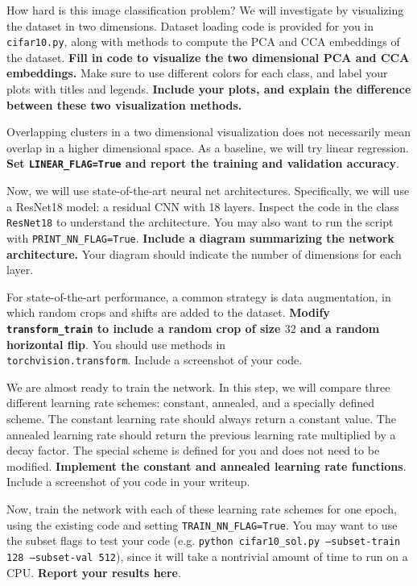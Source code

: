 \documentclass[preview]{standalone}
\begin{document}
\begin{Parts}
\Part 
How hard is this image classification problem? We will investigate by visualizing the dataset in two dimensions. 
Dataset loading code is provided for you in \texttt{cifar10.py}, along with methods to compute the PCA and CCA embeddings of the dataset. {\bf Fill in code to visualize the two dimensional PCA and CCA embeddings.} Make sure to use different colors for each class, and label your plots with titles and legends.
{\bf Include your plots, and explain the difference between these two visualization methods.} 




\Part 
Overlapping clusters in a two dimensional visualization does not necessarily mean overlap in a higher dimensional space. 
As a baseline, we will try linear regression. {\bf Set \texttt{LINEAR\_FLAG=True} and report the training and validation accuracy}.



\Part Now, we will use state-of-the-art neural net architectures. Specifically, we will use a ResNet18 model: a residual CNN with 18 layers. Inspect the code in the class \texttt{ResNet18} to understand the architecture. You may also want to run the script with \texttt{PRINT\_NN\_FLAG=True}. {\bf Include a diagram summarizing the network architecture.} Your diagram should indicate the number of dimensions for each layer. 




\Part For state-of-the-art performance, a common strategy is data augmentation, in which random crops and shifts are added to the dataset. 
{\bf Modify \texttt{transform\_train} to include a random crop of size $32$ and a random horizontal flip}. You should use methods in \\
\texttt{torchvision.transform}. Include a screenshot of your code.





\Part We are almost ready to train the network.
In this step, we will compare three different learning rate schemes: constant, annealed, and a specially defined scheme.
The constant learning rate should always return a constant value. The annealed learning rate should return the previous learning rate multiplied by a decay factor.
The special scheme is defined for you and does not need to be modified. 
{\bf Implement the constant and annealed learning rate functions}. 
Include a screenshot of you code in your writeup.

Now, train the network with each of these learning rate schemes for one epoch, using the existing code and setting \texttt{TRAIN\_NN\_FLAG=True}.
You may want to use the subset flags to test your code (e.g. \texttt{python cifar10\_sol.py --subset-train 128 --subset-val 512}), since it will take a nontrivial amount of time to run on a CPU.
{\bf Report your results here}. 




\end{Parts}
\end{document}

